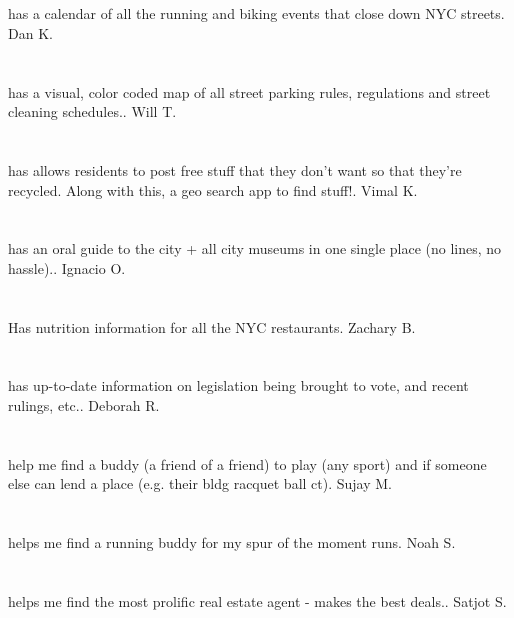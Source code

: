 \section{}has a calendar of all the running and biking events that close down NYC streets. Dan K.
\section{}has a visual,  color coded map of all street parking rules,  regulations and street cleaning schedules.. Will T.
\section{}has allows residents to post free stuff that they don't want so that they're recycled.  Along with this,  a geo search app to find stuff!. Vimal K.
\section{}has an oral guide to the city + all city museums in one single place (no lines,  no hassle).. Ignacio O.
\section{}Has nutrition information for all the NYC restaurants. Zachary B.
\section{}has up-to-date information on legislation being brought to vote,  and recent rulings,  etc.. Deborah R.
\section{}help me find a buddy (a friend of a friend) to play (any sport) and if someone else can lend a place (e.g. their bldg racquet ball ct). Sujay M.
\section{}helps me find a running buddy for my spur of the moment runs. Noah S.
\section{}helps me find the most prolific real estate agent - makes the best deals.. Satjot S.
